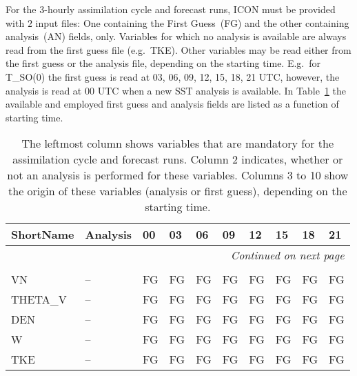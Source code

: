  
For the 3-hourly assimilation cycle and forecast runs, ICON must be provided with $2$ input files: One containing the First Guess~(FG) and the other 
containing analysis~(AN) fields, only. Variables for which no analysis is available are always read from the first guess file (e.g.\ TKE). 
Other variables may be read either from the first guess or the analysis file, depending on the starting time. E.g.\ for T\_SO(0) the first 
guess is read at 03, 06, 09, 12, 15, 18, 21 UTC, however, the analysis is read at 00 UTC when a new SST analysis is available. 
In Table~\ref{tbl_analysis} the available and employed first guess and analysis fields are listed as a function of starting time.

\begin{longtable}{p{3.3cm}>{\centering\arraybackslash}p{2.5cm}p{0.7cm}p{0.7cm}p{0.7cm}p{0.7cm}p{0.7cm}p{0.7cm}p{0.7cm}p{0.7cm}}
\caption[]{The leftmost column shows variables that are mandatory for the assimilation cycle and forecast runs.  Column 2 indicates, whether or not an analysis is performed 
for these variables. Columns 3 to 10 show the origin of these variables (analysis or first guess), depending on the starting time.}\label{tbl_analysis}\\
  \toprule
\textbf{ShortName}  &  \textbf{Analysis}  & \textbf{00} & \textbf{03} & \textbf{06} & \textbf{09} & \textbf{12} & \textbf{15} & \textbf{18} &  \textbf{21} \\
\midrule
\endhead
\hline \multicolumn{10}{r}{\textit{Continued on next page}} \\
\endfoot
\endlastfoot
\hline \multicolumn{10}{l}{\textbf{Atmosphere}} \\
VN                  &     --              &   FG         &     FG      &     FG      &     FG      &     FG      &     FG      &     FG      &    FG         \\
THETA\_V            &     --              &   FG         &     FG      &     FG      &     FG      &     FG      &     FG      &     FG      &    FG         \\
DEN                 &     --              &   FG         &     FG      &     FG      &     FG      &     FG      &     FG      &     FG      &    FG         \\
W                   &     --              &   FG         &     FG      &     FG      &     FG      &     FG      &     FG      &     FG      &    FG         \\
TKE                 &     --              &   FG         &     FG      &     FG      &     FG      &     FG      &     FG      &     FG      &    FG         \\

\end{longtable}
